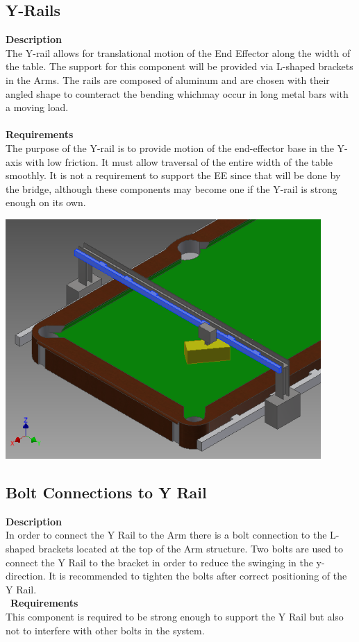 \documentclass[titlepage]{article}
\begin{document}
\subsection{Y-Rails}
\textbf{Description}\\
The Y-rail allows for translational motion of the End Effector along the width of the table. The support for this component will be provided via L-shaped brackets in the Arms. The rails are composed of aluminum and are chosen with their angled shape to counteract the bending whichmay occur in long metal bars with a moving load.
\\~\\
\textbf{Requirements}\\
The purpose of the Y-rail is to provide motion of the end-effector base in the Y-axis with low friction. It must allow traversal of the entire width of the table smoothly. It is not a requirement to support the EE since that will be done by the bridge, although these components may become one if the Y-rail is strong enough on its own.
\begin{center}
	\includegraphics[width = 0.9\textwidth]{yRail1.png} 		%
\label{fig:yRailFig}
\end{center}


\subsection{Bolt Connections to Y Rail}
\textbf{Description}\\
In order to connect the Y Rail to the Arm there is a bolt connection to the L-shaped brackets located at the top of the Arm structure. Two bolts are used to connect the Y Rail to the bracket in order to reduce the swinging in the y-direction. It is recommended to tighten the bolts after correct positioning of the Y Rail.\\\
\textbf{Requirements}\\
This component is required to be strong enough to support the Y Rail but also not to interfere with other bolts in the system.
\end{document}
